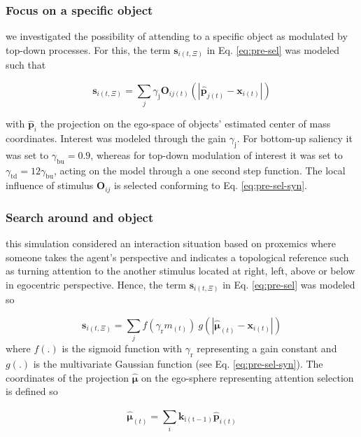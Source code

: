 \documentclass[letterpaper, 10 pt, conference]{ieeeconf}  %
\begin{document}
	\subsubsection{Focus on a specific object}
	
	we investigated the possibility of attending to a specific object as modulated by top-down processes. For this, the term $\mathbf{s}_{i(t,\Xi)}$ in Eq. \eqref{eq:pre-sel} was modeled such that
	
	\begin{equation}
	\mathbf{s}_{i(t,\Xi)} = \sum_{j}^{} \gamma_\mathrm{j}\mathbf{O}_{ij(t)}\left(|\mathbf{\hat{p}}_{j(t)} - \mathbf{x}_{i(t)}|\right)
	\label{eq:sim1}
	\end{equation}
	
	\noindent with $\mathbf{\hat{p}}_i$ the projection on the ego-space of objects' estimated center of mass coordinates. Interest was modeled through the gain $\gamma_\mathrm{j}$. For bottom-up saliency it was set to $\gamma_\mathrm{bu} = 0.9$, whereas for top-down modulation of interest it was set to $\gamma_\mathrm{td} = 12\gamma_\mathrm{bu}$, acting on the model through a one second step function. The local influence of stimulus $\mathbf{O}_{ij}$ is selected conforming to Eq. \eqref{eq:pre-sel-syn}.
	
	\subsubsection{Search around and object} this simulation considered an interaction situation based on proxemics where someone takes the agent's perspective and indicates a topological reference such as turning attention to the another stimulus located at right, left, above or below in egocentric perspective. Hence, the term $\mathbf{s}_{i(t,\Xi)}$ in Eq. \eqref{eq:pre-sel} was modeled so
	
	\begin{equation}
	\mathbf{s}_{i(t,\Xi)} = \sum_{j}^{} f\left(\gamma_\mathrm{r}m_{(t)}\right)\ g\left(\left|\boldsymbol{\hat{\mu}}_{(t)} - \mathbf{x}_{i(t)}\right|\right)
	\label{eq:sim2}
	\end{equation}
	\noindent where $f(.)$ is the sigmoid function with $\gamma_\mathrm{r}$ representing a gain constant and $g(.)$ is the multivariate Gaussian function (see Eq. \eqref{eq:pre-sel-syn}). The coordinates of the projection $\boldsymbol{\hat{\mu}}$ on the ego-sphere representing attention selection is defined so 
	
	\begin{equation}
	\boldsymbol{\hat{\mu}}_{(t)} = \sum_{i}^{}\mathbf{k}_\mathrm{i(t-1)}\mathbf{\hat{p}}_{i(t)}
	\label{eq:sim2-mu}
	\end{equation}
	
\end{document}
